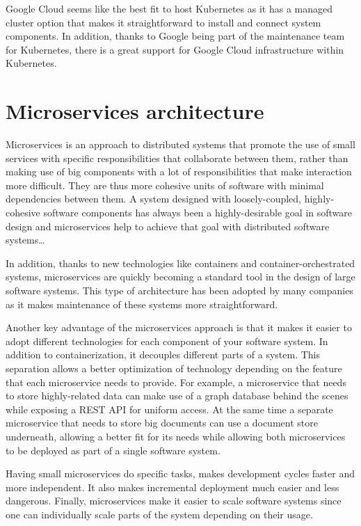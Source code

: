 Google Cloud seems like the best fit to host Kubernetes as it has a managed cluster option that makes it straightforward to install and connect system components. In addition, thanks to Google being part of the maintenance team for Kubernetes, there is a great support for Google Cloud infrastructure within Kubernetes.



\section{Microservices architecture}


Microservices is an approach to distributed systems that promote the use of small services with specific responsibilities that collaborate between them, rather than making use of big components with a lot of responsibilities that make interaction more difficult. They are thus more cohesive units of software with minimal dependencies between them. A system designed with loosely-coupled, highly-cohesive software components has always been a highly-desirable goal in software design\parencite{gradybook} and microservices help to achieve that goal with distributed software systems\ldots

In addition, thanks to new technologies like containers and container-orchestrated systems, microservices are quickly becoming a standard tool in the design of large software systems. This type of architecture has been adopted by many companies as it makes maintenance of these systems more straightforward. 

Another key advantage of the microservices approach is that it makes it easier to adopt different technologies for each component of your software system. In addition to containerization, it decouples different parts of a system. This separation allows a better optimization of technology depending on the feature that each microservice needs to provide. For example, a microservice that needs to store highly-related data can make use of a graph database behind the scenes while exposing a REST API for uniform access. At the same time a separate microservice that needs to store big documents can use a document store underneath, allowing a better fit  for its needs while allowing both microservices to be deployed as part of a single software system. 

Having small microservices do specific tasks, makes development cycles faster and more independent. It also makes incremental deployment much easier and less dangerous. Finally, microservices make it easier to scale software systems since one can individually scale parts of the system depending on their usage.\parencite{microservicesScale}


